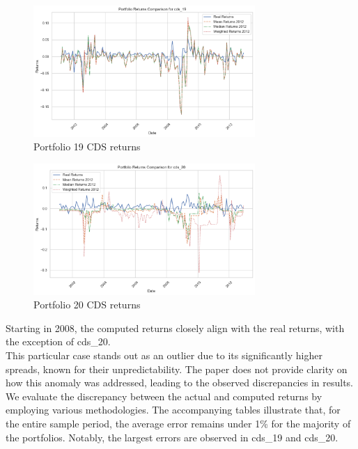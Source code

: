 \documentclass{article}
\begin{document}
\begin{figure}[H]
    \centering
    \includegraphics[width=0.75\textwidth]{../assets/returns_cds19_insample.png}
    \caption{\label{fig:cds_rets_p19}Portfolio 19 CDS returns}
    \end{figure}   

\begin{figure}[H]
    \centering
    \includegraphics[width=0.75\textwidth]{../assets/returns_cds20_insample.png}
    \caption{\label{fig:cds_rets_p20}Portfolio 20 CDS returns}
    \end{figure}   


Starting in 2008, the computed returns closely align with the real returns, with the exception of cds\_20.\\ 

This particular case stands out as an outlier due to its significantly higher spreads, known for their unpredictability. The paper does not provide clarity on how this anomaly was addressed, leading to the observed discrepancies in results.\\

We evaluate the discrepancy between the actual and computed returns by employing various methodologies. The accompanying tables illustrate that, for the entire sample period, the average error remains under 1\% for the majority of the portfolios. Notably, the largest errors are observed in cds\_19 and cds\_20.
\end{document}
